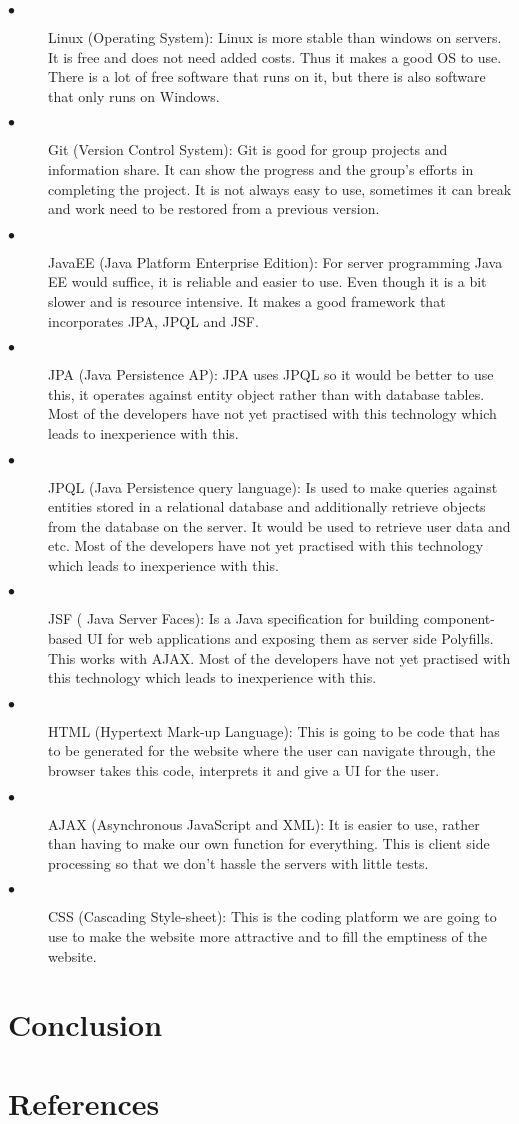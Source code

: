 \documentclass[12pt]{article}
\begin{document}
\begin{description}
  \item[$\bullet$] Linux (Operating System):
  Linux is more stable than windows on servers. It is free and does not need added costs. Thus it makes a good OS to use. There is a lot of free software that runs on it, but there is also software that only runs on Windows. 
  
  \item[$\bullet$] Git (Version Control System):
  Git is good for group projects and information share. It can show the progress and the group’s efforts in completing the project. It is not always easy to use, sometimes it can break and work need to be restored from a previous version.
  
  \item[$\bullet$] JavaEE (Java Platform Enterprise Edition):
  For server programming Java EE would suffice, it is reliable and easier to use. Even though it is a bit slower and is resource intensive. It makes a good framework that incorporates JPA,  JPQL and JSF.
  
  \item[$\bullet$]JPA (Java Persistence AP):
  JPA uses JPQL so it would be better to use this, it operates against entity object rather than with database tables. Most of the developers have not yet practised with this technology which leads to inexperience with this. 
  
  \item[$\bullet$] JPQL (Java Persistence query language):
  Is used to make queries against entities stored in a relational database and additionally retrieve objects from the database on the server. It would be used to retrieve user data and etc. Most of the developers have not yet practised with this technology which leads to inexperience with this. 
  
  \item[$\bullet$] JSF ( Java Server Faces):
  Is a Java specification for building component-based UI for web applications and exposing them as server side Polyfills. This works with AJAX. Most of the developers have not yet practised with this technology which leads to inexperience with this. 
  
  \item[$\bullet$] HTML (Hypertext Mark-up Language):
  This is going to be code that has to be generated for the website where the user can navigate through, the browser takes this code, interprets it and give a UI for the user. 
  
  \item[$\bullet$] AJAX (Asynchronous JavaScript and XML):
  It is easier to use, rather than having to make our own function for everything. This is client side processing so that we don’t hassle the servers with little tests.
  
  \item[$\bullet$] CSS (Cascading Style-sheet):
  This is the coding platform we are going to use to make the website more attractive and to fill the emptiness of the website.
\end{description}

\section{Conclusion}

\section{References}
\end{document}
